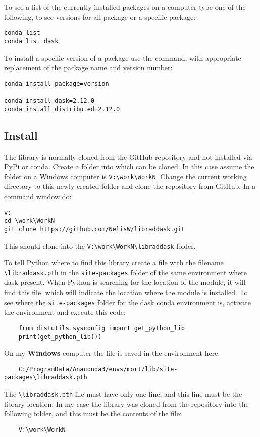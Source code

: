 To see a list of the currently installed packages on a computer type one of the following, to see versions for all package or a specific package:
\begin{lstlisting}
conda list
conda list dask
\end{lstlisting}

To install a specific version of a package use the command, with appropriate replacement of the package name and version number:
\begin{lstlisting}
conda install package=version

conda install dask=2.12.0
conda install distributed=2.12.0
\end{lstlisting}


\subsection{Install \libraddask{}}
\label{sec:Installlibraddask}

The \libraddask{} library is normally cloned from the GitHub repository and not installed via PyPi or conda. 
Create a folder into which \libraddask{} can be cloned. In this case assume the folder on a Windows computer is \lstinline{V:\work\WorkN}.  Change the current working directory to this newly-created folder and clone the \libraddask{}  repository from GitHub. In a command window do:
\begin{lstlisting}
v:
cd \work\WorkN
git clone https://github.com/NelisW/libraddask.git
\end{lstlisting}
This should clone \libraddask{}  into the \lstinline{V:\work\WorkN\libraddask} folder.

To tell Python where to find this library create a file with the filename \lstinline{\libraddask.pth} in the \lstinline{site-packages} folder of the same environment where dask present. When Python is searching for the location of the \libraddask{} module, it will find this file, which will indicate the location where the module is installed.
To see where the \lstinline{site-packages} folder for the dask conda environment is,  activate the environment and execute this code:
\begin{lstlisting}
    from distutils.sysconfig import get_python_lib
    print(get_python_lib())
\end{lstlisting}

On my\textbf{ Windows} computer the file is saved in the environment here: 
\begin{lstlisting}
    C:/ProgramData/Anaconda3/envs/mort/lib/site-packages\libraddask.pth
\end{lstlisting}
The \lstinline{\libraddask.pth} file must have only one line, and this line must be the \libraddask{}  library location.    In my case the library was cloned from the repository into the following folder, and this must be the contents of the file:
\begin{lstlisting}
    V:\work\WorkN
\end{lstlisting}

